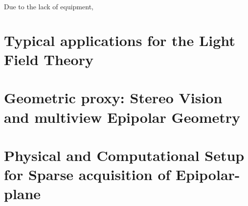 \bigskip

Due to the lack of equipment, 

\section{Typical applications for the Light Field Theory}
\label{sec:LF-applications}

\section{Geometric proxy: Stereo Vision and multiview Epipolar Geometry}
\label{sec:Epi-geometry}

\section{Physical and Computational Setup for Sparse acquisition of Epipolar-plane}
\label{sec:Sparse-acquisition}

